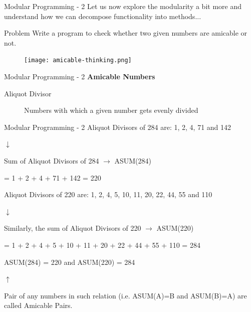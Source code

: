 \documentclass[14pt]{beamer}
\begin{document}
\begin{frame}{Modular Programming - 2}
Let us now explore the modularity a bit more and understand how we can decompose functionality into methods...
\begin{block}{Problem}
Write a program to check whether two given numbers are amicable or not.
\end{block}
\begin{figure}[H]
\begin{center}
\texttt{[image: amicable-thinking.png]}
\end{center}
\end{figure}
\end{frame}

\begin{frame}{Modular Programming - 2}
\textbf{Amicable Numbers}

\vspace{1.5pc}
\begin{description}
\item [Aliquot Divisor] Numbers with which a given number gets evenly divided
\end{description}
\end{frame}

\begin{frame}{Modular Programming - 2}
\small
Aliquot Divisors of 284 are: 1, 2, 4, 71 and 142 
\begin{minipage}{12cm}
\hspace{5cm}$\downarrow$
\end{minipage}
Sum of Aliquot Divisors of 284 $\rightarrow$ ASUM(284) 

=  1 + 2 + 4 + 71 + 142  = 220

Aliquot Divisors of 220 are: 
1, 2, 4, 5, 10, 11, 20, 22, 44, 55 and 110
\begin{minipage}{12cm}
\hspace{5cm}$\downarrow$
\end{minipage}
Similarly, the sum of Aliquot Divisors of 220 $\rightarrow$ ASUM(220) 

=  1 + 2 + 4 + 5 + 10 + 11 + 20 + 22 + 44 + 55 + 110  = 284

ASUM(284) = 220 and ASUM(220) = 284

\begin{minipage}{12cm}
\hspace{5cm}$\uparrow$
\end{minipage}
Pair of any numbers in such relation (i.e. ASUM(A)=B and ASUM(B)=A) are called Amicable Pairs.
\end{frame}
\end{document}
